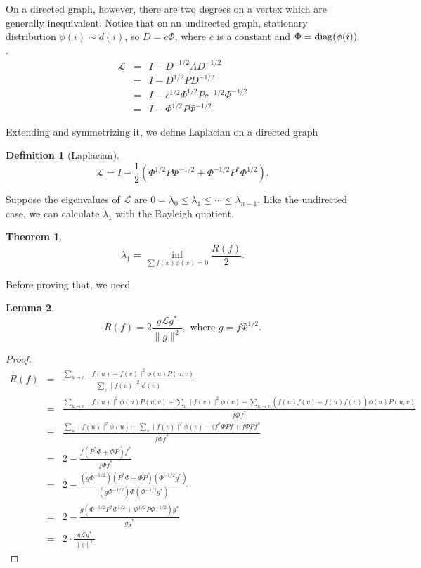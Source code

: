 \documentclass[twoside]{article}
\theoremstyle{definition}
\newtheorem{thm}{Theorem}[section]
\newtheorem{lem}[thm]{Lemma}
\theoremstyle{definition}
\newtheorem*{defn}{Definition}
\theoremstyle{remark}
\def\L{{\mathcal L}}
\def\diag{{\rm diag}}
\begin{document}
  On a directed graph, however, there are two degrees on a vertex which are generally inequivalent. Notice that on an undirected graph, stationary distribution $\phi(i)\sim d(i)$, so $D=c\Phi$, where $c$ is a constant and $\Phi=\diag(\phi(i))$.
  \begin{eqnarray*}
   \L &=& I-D^{-1/2}AD^{-1/2} \\
      &=& I-D^{1/2}PD^{-1/2} \\
      &=& I-c^{1/2}\Phi^{1/2}Pc^{-1/2}\Phi^{-1/2} \\
      &=& I-\Phi^{1/2}P\Phi^{-1/2}
  \end{eqnarray*}

  Extending and symmetrizing it, we define Laplacian on a directed graph
  \begin{defn}[Laplacian]
    \[\L=I-\frac{1}{2}(\Phi^{1/2}P\Phi^{-1/2}+\Phi^{-1/2}P^*\Phi^{1/2}).\]
  \end{defn}

  Suppose the eigenvalues of $\L$ are $0= \lambda_0 \leq \lambda_1 \leq \cdots \leq \lambda_{n-1}$. Like the undirected case, we can calculate $\lambda_1$ with the Rayleigh quotient.
  \begin{thm}\label{thm1}
  \[\lambda_1=\inf_{\sum f(x)\phi(x)=0} \frac{R(f)}{2}.\]
  \end{thm}
  Before proving that, we need
  \begin{lem}\label{thm2}
  \[R(f)=2\frac{g\L g^*}{\parallel g\parallel^2},\textrm{ where } g=f\Phi^{1/2}.\]
  \end{lem}

  \begin{proof}
  \begin{eqnarray*}
    R(f) &=& \frac{\sum_{u\rightarrow v} \mid f(u)-f(v) \mid^2 \phi(u)P(u,v)} {\sum_{v} \mid f(v)\mid^2 \phi(v)} \\
         &=& \frac{\sum_{u\rightarrow v} \mid f(u)\mid^2 \phi(u)P(u,v) + \sum_{v} \mid f(v)\mid^2 \phi(v) - \sum_{u\rightarrow v} (\overline{f(u)}f(v) + f(u)\overline{f(v)}) \phi(u)P(u,v)} {f\Phi f^*} \\
         &=& \frac{\sum_{u} \mid f(u)\mid^2 \phi(u) + \sum_{v} \mid f(v)\mid^2 \phi(v) - (f^* \Phi P f + f \Phi P f^*} {f\Phi f^*} \\
         &=& 2-\frac{f(P^*\Phi + \Phi P)f^*}{f\Phi f^*} \\
         &=& 2-\frac{(g\Phi^{-1/2})(P^*\Phi + \Phi P)(\Phi^{-1/2}g^*)}{(g\Phi^{-1/2})\Phi (\Phi^{-1/2} g^*)} \\
         &=& 2-\frac{g(\Phi^{-1/2}P^*\Phi^{1/2} + \Phi^{1/2} P\Phi^{-1/2})g^*}{gg^*} \\
		 &=& 2\cdot\frac{g\L g^*}{\parallel g\parallel^2}
  \end{eqnarray*}
  \end{proof}
\end{document}

